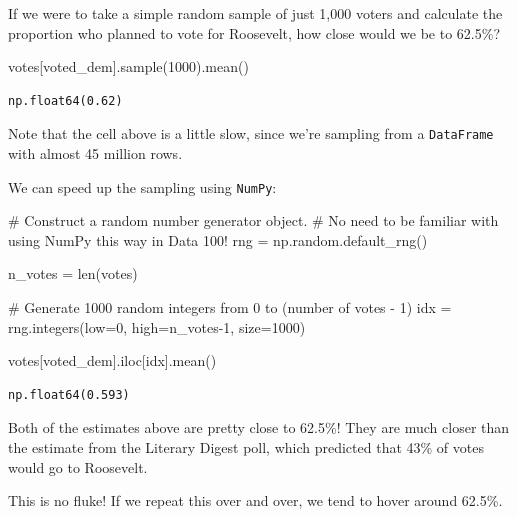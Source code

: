 \documentclass[
  letterpaper,
  DIV=11,
  numbers=noendperiod]{scrreprt}
\newenvironment{Shaded}{\begin{snugshade}}{\end{snugshade}}
\newcommand{\BuiltInTok}[1]{\textcolor[rgb]{0.00,0.23,0.31}{#1}}
\newcommand{\CommentTok}[1]{\textcolor[rgb]{0.37,0.37,0.37}{#1}}
\newcommand{\DecValTok}[1]{\textcolor[rgb]{0.68,0.00,0.00}{#1}}
\newcommand{\NormalTok}[1]{\textcolor[rgb]{0.00,0.23,0.31}{#1}}
\newcommand{\OperatorTok}[1]{\textcolor[rgb]{0.37,0.37,0.37}{#1}}
\newcommand{\StringTok}[1]{\textcolor[rgb]{0.13,0.47,0.30}{#1}}
\begin{document}
If we were to take a simple random sample of just 1,000 voters and
calculate the proportion who planned to vote for Roosevelt, how close
would we be to 62.5\%?

\begin{Shaded}
\begin{Highlighting}[]
\NormalTok{votes[}\StringTok{\textquotesingle{}voted\_dem\textquotesingle{}}\NormalTok{].sample(}\DecValTok{1000}\NormalTok{).mean()}
\end{Highlighting}
\end{Shaded}

\begin{verbatim}
np.float64(0.62)
\end{verbatim}

Note that the cell above is a little slow, since we're sampling from a
\texttt{DataFrame} with almost 45 million rows.

We can speed up the sampling using \texttt{NumPy}:

\begin{Shaded}
\begin{Highlighting}[]
\CommentTok{\# Construct a random number generator object.}
\CommentTok{\# No need to be familiar with using NumPy this way in Data 100!}
\NormalTok{rng }\OperatorTok{=}\NormalTok{ np.random.default\_rng()}

\NormalTok{n\_votes }\OperatorTok{=} \BuiltInTok{len}\NormalTok{(votes)}

\CommentTok{\# Generate 1000 random integers from 0 to (number of votes {-} 1)}
\NormalTok{idx }\OperatorTok{=}\NormalTok{ rng.integers(low}\OperatorTok{=}\DecValTok{0}\NormalTok{, high}\OperatorTok{=}\NormalTok{n\_votes}\OperatorTok{{-}}\DecValTok{1}\NormalTok{, size}\OperatorTok{=}\DecValTok{1000}\NormalTok{)}

\NormalTok{votes[}\StringTok{\textquotesingle{}voted\_dem\textquotesingle{}}\NormalTok{].iloc[idx].mean()}
\end{Highlighting}
\end{Shaded}

\begin{verbatim}
np.float64(0.593)
\end{verbatim}

Both of the estimates above are pretty close to 62.5\%! They are much
closer than the estimate from the Literary Digest poll, which predicted
that 43\% of votes would go to Roosevelt.

This is no fluke! If we repeat this over and over, we tend to hover
around 62.5\%.
\end{document}
